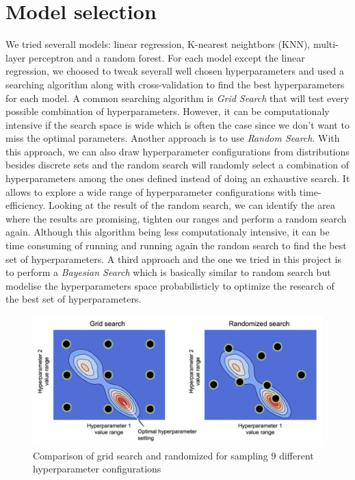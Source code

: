 \section{Model selection}

We tried severall models: linear regression, K-nearest neightbors (KNN), multi-layer perceptron and a random forest. For each model except the linear regression, we choosed to tweak severall well chosen hyperparameters and used a searching algorithm along with cross-validation to find the best hyperparameters for each model. A common searching algorithm is \textit{Grid Search} that will test every possible combination of hyperparameters. However, it can be computationaly intensive if the search space is wide which is often the case since we don't want to miss the optimal parameters. Another approach is to use \textit{Random Search}. With this approach, we can also draw hyperparameter configurations from distributions besides discrete sets and the random search will randomly select a combination of hyperparameters among the ones defined instead of doing an exhaustive search. It allows to explore a wide range of hyperparameter configurations with time-efficiency. Looking at the result of the random search, we can identify the area where the results are promising, tighten our ranges and perform a random search again. Although this algorithm being less computationaly intensive, it can be time consuming of running and running again the random search to find the best set of hyperparameters. A third approach and the one we tried in this project is to perform a \textit{Bayesian Search} which is basically similar to random search but modelise the hyperparameters space probabilisticly to optimize the research of the best set of hyperparameters.

\begin{figure}[H]
	\centering
	\includegraphics{figures/grid_search_vs_random_search.png}
	\caption{Comparison of grid search and randomized for sampling $9$ different hyperparameter configurations}
	\label{fig:gridsearch_vs_randomsearch}
\end{figure}

